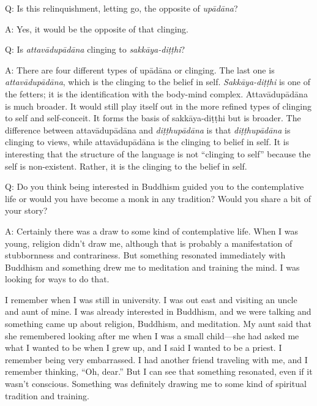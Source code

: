 \vspace{\the\qaskip}
Q: Is this relinquishment, letting go, the opposite of \emph{upādāna}?

\vspace{\the\qaskip}
A: Yes, it would be the opposite of that clinging.

\vspace{\the\qaskip}
Q: Is \emph{attavādupādāna} clinging to \emph{sakkāya-diṭṭhi}?

\vspace{\the\qaskip}
A: There are four different types of upādāna or clinging. The last one
is \emph{attavādupādāna}, which is the clinging to the belief in self.
\emph{Sakkāya-diṭṭhi} is one of the fetters; it is the identification
with the body-mind complex. Attavādupādāna is much broader. It would
still play itself out in the more refined types of clinging to self and
self-conceit. It forms the basis of sakkāya-diṭṭhi but is broader. The
difference between attavādupādāna and \emph{diṭṭhupādāna} is that
\emph{diṭṭhupādāna} is clinging to views, while attavādupādāna is the
clinging to belief in self. It is interesting that the structure of the
language is not “clinging to self” because the self is non-existent.
Rather, it is the clinging to the belief in self.

\vspace{\the\qaskip}
Q: Do you think being interested in Buddhism guided you to the
contemplative life or would you have become a monk in any tradition?
Would you share a bit of your story?

\vspace{\the\qaskip}
A: Certainly there was a draw to some kind of contemplative life. When I
was young, religion didn’t draw me, although that is probably a
manifestation of stubbornness and contrariness. But something resonated
immediately with Buddhism and something drew me to meditation and
training the mind. I was looking for ways to do that.

I remember when I was still in university. I was out east and visiting
an uncle and aunt of mine. I was already interested in Buddhism, and we
were talking and something came up about religion, Buddhism, and
meditation. My aunt said that she remembered looking after me when I was
a small child—she had asked me what I wanted to be when I grew up, and I
said I wanted to be a priest. I remember being very embarrassed. I had
another friend traveling with me, and I remember thinking, “Oh, dear.”
But I can see that something resonated, even if it wasn’t conscious.
Something was definitely drawing me to some kind of spiritual tradition
and training.

